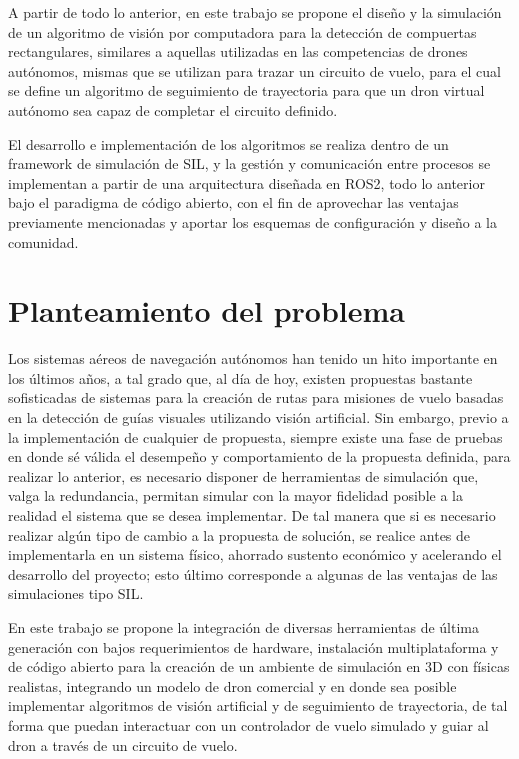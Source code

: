 A partir de todo lo anterior, en este trabajo se propone el diseño y la simulación de un algoritmo de visión por computadora para la detección de compuertas rectangulares, similares a aquellas utilizadas en las competencias de drones autónomos, mismas que se utilizan para trazar un circuito de vuelo, para el cual se define un algoritmo de seguimiento de trayectoria para que un dron virtual autónomo sea capaz de completar el circuito definido.  

El desarrollo e implementación de los algoritmos se realiza dentro de un framework de simulación de SIL, y la gestión y comunicación entre procesos se implementan a partir de una arquitectura diseñada en ROS2, todo lo anterior bajo el paradigma de código abierto, con el fin de aprovechar las ventajas previamente mencionadas y aportar los esquemas de configuración y diseño a la comunidad.


\section{Planteamiento del problema}
Los sistemas aéreos de navegación autónomos han tenido un hito importante en los últimos años, a tal grado que, al día de hoy, existen propuestas bastante sofisticadas de sistemas para la creación de rutas para misiones de vuelo basadas en la detección de guías visuales utilizando visión artificial. Sin embargo, previo a la implementación de cualquier de propuesta, siempre existe una fase de pruebas en donde sé válida el desempeño y comportamiento de la propuesta definida, para realizar lo anterior, es necesario disponer de herramientas de simulación que, valga la redundancia, permitan simular con la mayor fidelidad posible a la realidad el sistema que se desea implementar. De tal manera que si es necesario realizar algún tipo de cambio a la propuesta de solución, se realice antes de implementarla en un sistema físico, ahorrado sustento económico y acelerando el desarrollo del proyecto; esto último corresponde a algunas de las ventajas de las simulaciones tipo SIL. 

En este trabajo se propone la integración de diversas herramientas de última generación con bajos requerimientos de hardware, instalación multiplataforma y de código abierto para la creación de un ambiente de simulación en 3D con físicas realistas, integrando un modelo de dron comercial y en donde sea posible implementar algoritmos de visión artificial y de seguimiento de trayectoria, de tal forma que puedan interactuar con un controlador de vuelo simulado y guiar al dron a través de un circuito de vuelo.    

